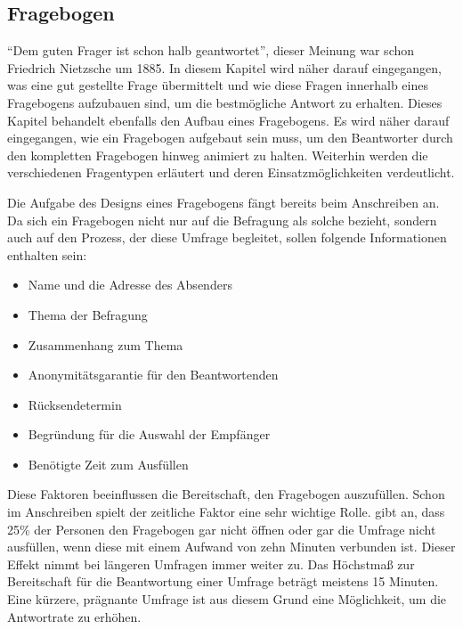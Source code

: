 \subsection{Fragebogen}
\label{acqusition}
\enquote{Dem guten Frager ist schon halb geantwortet}, dieser Meinung war schon Friedrich Nietzsche um 1885.\autocite{Nietzsche}
In diesem Kapitel wird näher darauf eingegangen, was eine gut gestellte Frage übermittelt und wie diese Fragen innerhalb eines Fragebogens aufzubauen sind, um die bestmögliche Antwort zu erhalten.
Dieses Kapitel behandelt ebenfalls den Aufbau eines Fragebogens. 
Es wird näher darauf eingegangen, wie ein Fragebogen aufgebaut sein muss, um den Beantworter durch den kompletten Fragebogen hinweg animiert zu halten. 
Weiterhin werden die verschiedenen Fragentypen erläutert und deren Einsatzmöglichkeiten verdeutlicht. 

Die Aufgabe des Designs eines Fragebogens fängt bereits beim Anschreiben an.
Da sich ein Fragebogen nicht nur auf die Befragung als solche bezieht, sondern auch auf den Prozess, der diese Umfrage begleitet, sollen folgende Informationen enthalten sein:\autocite[Vgl.][S. 29]{2003Fragebogen} %
% 
\begin{itemize}
	\item Name und die Adresse des Absenders
	\item Thema der Befragung
	\item Zusammenhang zum Thema
	\item Anonymitätsgarantie für den Beantwortenden
	\item Rücksendetermin
	\item Begründung für die Auswahl der Empfänger 
	\item Benötigte Zeit zum Ausfüllen 
\end{itemize}
% 
Diese Faktoren beeinflussen die Bereitschaft, den Fragebogen auszufüllen.
Schon im Anschreiben spielt der zeitliche Faktor eine sehr wichtige Rolle. %
\citeauthor{NFP} gibt an, dass 25\% der Personen den Fragebogen gar nicht öffnen oder gar die Umfrage nicht ausfüllen, wenn diese mit einem Aufwand von zehn Minuten verbunden ist.
Dieser Effekt nimmt bei längeren Umfragen immer weiter zu.\autocite[Vgl.][S. 353]{NFP}
Das Höchstmaß zur Bereitschaft für die Beantwortung einer Umfrage beträgt meistens 15 Minuten.\autocite[Vgl.][S. 37]{2009Fragebogen}%
Eine kürzere, prägnante Umfrage ist aus diesem Grund eine Möglichkeit, um die Antwortrate zu erhöhen.

